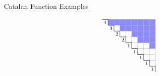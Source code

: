 \documentclass[dvipsnames]{beamer}
\theoremstyle{definition}
\newcommand{\qtrootcolor}{blue!45}
\newcounter{c}
\begin{document}
\begin{frame}{Catalan Function Examples}
\begin{itemize}
\[\begin{tikzpicture}[scale=.3]
\foreach \r/\c in {1/2,1/3,1/4,1/5,1/6,1/7,1/8,1/9,2/4,2/5,2/6,2/7,2/8,2/9,3/6,3/7,3/8,3/9,4/7,4/8,4/9,5/9} {
  \draw[draw = none, fill=\qtrootcolor] (\c,-\r) rectangle (\c+1,-\r-1);
}
         \draw[thin, black!31] (1,-1) -- (10,-1);
\draw[thin, black!31] (2,-1) -- (2,-1);
\draw[thin, black!31] (2,-2) -- (10,-2);
\draw[thin, black!31] (3,-2) -- (3,-1);
\draw[thin, black!31] (3,-3) -- (10,-3);
\draw[thin, black!31] (4,-3) -- (4,-1);
\draw[thin, black!31] (4,-4) -- (10,-4);
\draw[thin, black!31] (5,-4) -- (5,-1);
\draw[thin, black!31] (5,-5) -- (10,-5);
\draw[thin, black!31] (6,-5) -- (6,-1);
\draw[thin, black!31] (6,-6) -- (10,-6);
\draw[thin, black!31] (7,-6) -- (7,-1);
\draw[thin, black!31] (7,-7) -- (10,-7);
\draw[thin, black!31] (8,-7) -- (8,-1);
\draw[thin, black!31] (8,-8) -- (10,-8);
\draw[thin, black!31] (9,-8) -- (9,-1);
\draw[thin, black!31] (9,-9) -- (10,-9);
\draw[thin, black!31] (10,-9) -- (10,-1);
 \draw[thin] (1,-1) -- (2,-1);
\draw[thin] (2,-1) -- (2,-2);
\draw[thin] (2,-2) -- (3,-2);
\draw[thin] (3,-2) -- (3,-3);
\draw[thin] (3,-3) -- (4,-3);
\draw[thin] (4,-3) -- (4,-4);
\draw[thin] (4,-4) -- (5,-4);
\draw[thin] (5,-4) -- (5,-5);
\draw[thin] (5,-5) -- (6,-5);
\draw[thin] (6,-5) -- (6,-6);
\draw[thin] (6,-6) -- (7,-6);
\draw[thin] (7,-6) -- (7,-7);
\draw[thin] (7,-7) -- (8,-7);
\draw[thin] (8,-7) -- (8,-8);
\draw[thin] (8,-8) -- (9,-8);
\draw[thin] (9,-8) -- (9,-9);
\draw[thin] (9,-9) -- (10,-9);
\draw[thin] (10,-9) -- (10,-10);
\node at (1.5,-1.5) {\scriptsize $4$};
\node at (2.5,-2.5) {\scriptsize $3$};
\node at (3.5,-3.5) {\scriptsize $2$};
\node at (4.5,-4.5) {\scriptsize $2$};
\node at (5.5,-5.5) {\scriptsize $1$};
\node at (6.5,-6.5) {\scriptsize $1$};
\node at (7.5,-7.5) {\scriptsize $1$};
\node at (8.5,-8.5) {\scriptsize $1$};
\node at (9.5,-9.5) {\scriptsize $1$};
      \end{tikzpicture}
    \]
  \end{itemize}
\end{frame}
\end{document}
